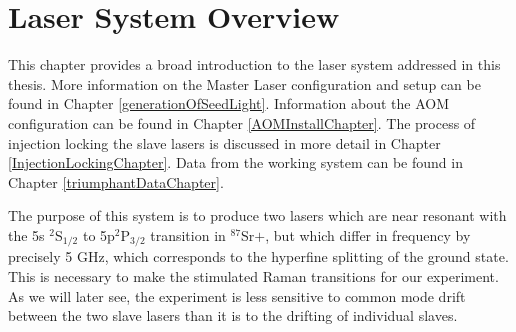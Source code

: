 \chapter{Laser System Overview}

This chapter provides a broad introduction to the laser system addressed in this thesis. More information on the Master Laser configuration and setup can be found in Chapter \ref{generationOfSeedLight}. Information about the AOM configuration can be found in Chapter \ref{AOMInstallChapter}. The process of injection locking the slave lasers is discussed in more detail in Chapter \ref{InjectionLockingChapter}. Data from the working system can be found in Chapter \ref{triumphantDataChapter}.

The purpose of this system is to produce two lasers which are near resonant with the 5s $^2$S$_{1/2}$ to 5p$^2$P$_{3/2}$ transition in $^{87}$Sr$+$, but which differ in frequency by precisely 5 GHz, which corresponds to the hyperfine splitting of the ground state. This is necessary to make the stimulated Raman transitions for our experiment. As we will later see, the experiment is less sensitive to common mode drift between the two slave lasers than it is to the drifting of individual slaves.
